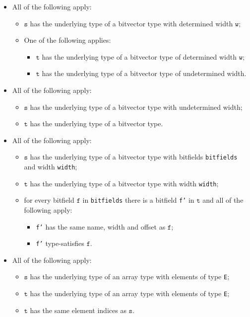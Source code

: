 \documentclass{book}
\newcommand\vf[0]{\texttt{f}}
\newcommand\vt[0]{\texttt{t}}
\newcommand\vs[0]{\texttt{s}}
\newcommand\vw[0]{\texttt{w}}
\begin{document}
\begin{itemize}
  \item All of the following apply:
    \begin{itemize}
    \item $\vs$ has the underlying type of a bitvector type with determined width $\vw$;
    \item One of the following applies:
      \begin{itemize}
      \item $\vt$ has the underlying type of a bitvector type of determined width $\vw$;
      \item $\vt$ has the underlying type of a bitvector type of undetermined width.
      \end{itemize}
    \end{itemize}

  \item All of the following apply:
    \begin{itemize}
    \item $\vs$ has the underlying type of a bitvector type with undetermined width;
    \item $\vt$ has the underlying type of a bitvector type.
    \end{itemize}

  \item All of the following apply:
    \begin{itemize}
    \item $\vs$ has the underlying type of a bitvector type with bitfields \texttt{bitfields} and width \texttt{width};
    \item $\vt$ has the underlying type of a bitvector type with width \texttt{width};
    \item for every bitfield $\vf$ in \texttt{bitfields} there is a bitfield \texttt{f'} in $\vt$ and
      all of the following apply:
      \begin{itemize}
      \item \texttt{f'} has the same name, width and offset as $\vf$;
      \item \texttt{f'} type-satisfies $\vf$.
      \end{itemize}
    \end{itemize}

  \item All of the following apply:
    \begin{itemize}
    \item $\vs$ has the underlying type of an array type with elements of type \texttt{E};
    \item $\vt$ has the underlying type of an array type with elements of type \texttt{E};
    \item $\vt$ has the same element indices as $\vs$.
    \end{itemize}


\end{itemize}
\end{document}
